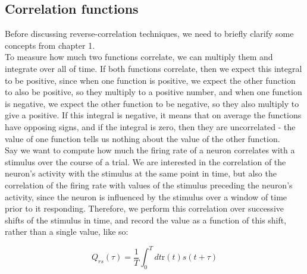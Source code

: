 \documentclass{article}
\begin{document}
\subsection{Correlation functions}

Before discussing reverse-correlation techniques, we need to briefly clarify some concepts from chapter 1.\\

To measure how much two functions correlate, we can multiply them and integrate over all of time. If both functions correlate, then we expect this integral to be positive, since when one function is positive, we expect the other function to also be positive, so they multiply to a positive number, and when one function is negative, we expect the other function to be negative, so they also multiply to give a positive. If this integral is negative, it means that on average the functions have opposing signs, and if the integral is zero, then they are uncorrelated - the value of one function tells us nothing about the value of the other function.\\

Say we want to compute how much the firing rate of a neuron correlates with a stimulus over the course of a trial. We are interested in the correlation of the neuron's activity with the stimulus at the same point in time, but also the correlation of the firing rate with values of the stimulus preceding the neuron's activity, since the neuron is influenced by the stimulus over a window of time prior to it responding. Therefore, we perform this correlation over successive shifts of the stimulus in time, and record the value as a function of this shift, rather than a single value, like so:

\begin{equation*}
    Q_{rs}(\tau) = \frac{1}{T} \int_0^Tdt \text{r}(t)s(t+\tau)
\end{equation*}
\end{document}
